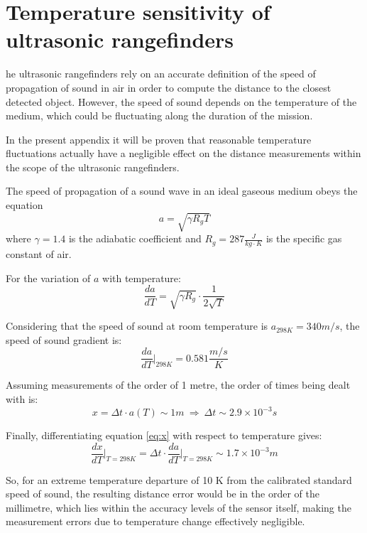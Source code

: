 
\chapter{Temperature sensitivity of ultrasonic rangefinders} \label{app:temperature}

he ultrasonic rangefinders rely on an accurate definition of the speed of propagation of sound in air in order to compute the distance to the closest detected object.
However, the speed of sound depends on the temperature of the medium, which could be fluctuating along the duration of the mission.

In the present appendix it will be proven that reasonable temperature fluctuations actually have a negligible effect on the distance measurements within the scope of the ultrasonic rangefinders.

The speed of propagation of a sound wave in an ideal gaseous medium obeys the equation
\begin{equation}
	a=\sqrt{\gamma R_g T}
\end{equation}
where $\gamma=1.4$ is the adiabatic coefficient and $R_g=287\frac{J}{kg\cdot K}$ is the specific gas constant of air.

For the variation of $a$ with temperature:
\begin{equation}
	\frac{da}{dT}=\sqrt{\gamma R_g}\cdot \frac{1}{2\sqrt{T}}
\end{equation}

Considering that the speed of sound at room temperature is $a_{298 K}=340 m/s$, the speed of sound gradient is:
\begin{equation}
	\frac{da}{dT}\Bigg\rvert_{298 K} = 0.581 \frac{m/s}{K}
\end{equation}

Assuming measurements of the order of 1 metre, the order of times being dealt with is:
\begin{equation}
	x=\Delta t \cdot a(T) \sim 1 m \ \Rightarrow\ \Delta t \sim 2.9\times 10^{-3} s
	\label{eq:x}
\end{equation}

Finally, differentiating equation \eqref{eq:x} with respect to temperature gives:
\begin{equation}
	\frac{dx}{dT}\Bigg\rvert_{T=298K} = \Delta t\cdot \frac{da}{dT}\Bigg\rvert_{T=298K} \sim 1.7\times 10^{-3} m
\end{equation}

So, for an extreme temperature departure of 10 K from the calibrated standard speed of sound, the resulting distance error would be in the order of the millimetre, which lies within the accuracy levels of the sensor itself, making the measurement errors due to temperature change effectively negligible.
